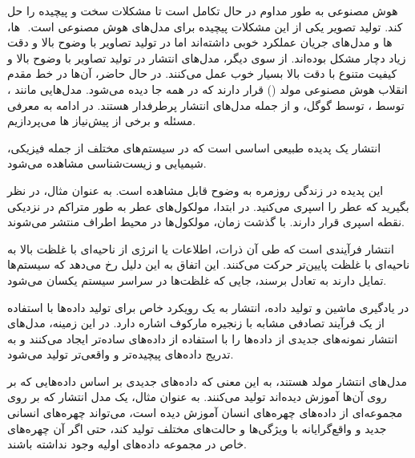
\label{فصل۱:مقدمه}

هوش مصنوعی به طور مداوم در حال تکامل است تا مشکلات سخت و پیچیده را حل کند. تولید تصویر یکی از این مشکلات پیچیده برای مدل‌های هوش مصنوعی است. ‌ ها، 
 ‌ها و مدل‌های جریان عملکرد خوبی داشته‌اند اما در تولید تصاویر با وضوح بالا و دقت زیاد دچار مشکل بوده‌اند. از سوی دیگر، مدل‌های انتشار در تولید تصاویر با وضوح بالا و کیفیت متنوع با دقت بالا بسیار خوب عمل می‌کنند. در حال حاضر، آن‌ها در خط مقدم انقلاب هوش مصنوعی مولد () قرار دارند که در همه جا دیده می‌شود. مدل‌هایی مانند ،  توسط ،  توسط گوگل، و  از جمله مدل‌های انتشار پرطرفدار هستند. در ادامه به معرفی مسئله و برخی از پیش‌نیاز ها می‌پردازیم.








انتشار یک پدیده طبیعی اساسی است که در سیستم‌های مختلف از جمله فیزیکی، شیمیایی و زیست‌شناسی مشاهده می‌شود.

این پدیده در زندگی روزمره به وضوح قابل مشاهده است. به عنوان مثال، در نظر بگیرید که عطر را اسپری می‌کنید. در ابتدا، مولکول‌های عطر به طور متراکم در نزدیکی نقطه اسپری قرار دارند. با گذشت زمان، مولکول‌ها در محیط اطراف منتشر می‌شوند.

انتشار فرآیندی است که طی آن ذرات، اطلاعات یا انرژی از ناحیه‌ای با غلظت بالا به ناحیه‌ای با غلظت پایین‌تر حرکت می‌کنند. این اتفاق به این دلیل رخ می‌دهد که سیستم‌ها تمایل دارند به تعادل برسند، جایی که غلظت‌ها در سراسر سیستم یکسان می‌شود.

در یادگیری ماشین و تولید داده، انتشار به یک رویکرد خاص برای تولید داده‌ها با استفاده از یک فرآیند تصادفی مشابه با زنجیره مارکوف اشاره دارد. در این زمینه، مدل‌های انتشار نمونه‌های جدیدی از داده‌ها را با استفاده از داده‌های ساده‌تر ایجاد می‌کنند و به تدریج داده‌های پیچیده‌تر و واقعی‌تر تولید می‌شود.







مدل‌های انتشار مولد هستند، به این معنی که داده‌های جدیدی بر اساس داده‌هایی که بر روی آن‌ها آموزش دیده‌اند تولید می‌کنند. به عنوان مثال، یک مدل انتشار که بر روی مجموعه‌ای از داده‌های چهره‌های انسان آموزش دیده است، می‌تواند چهره‌های انسانی جدید و واقع‌گرایانه با ویژگی‌ها و حالت‌های مختلف تولید کند، حتی اگر آن چهره‌های خاص در مجموعه داده‌های اولیه وجود نداشته باشند.

